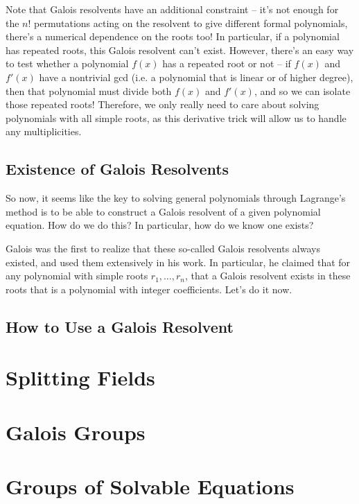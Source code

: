 \documentclass[12pt]{scrartcl}
\begin{document}
\begin{remark}
    Note that Galois resolvents have an additional constraint -- it's not enough for the $n!$ permutations acting on the resolvent to give different formal polynomials, there's a numerical dependence on the roots too! In particular, if a polynomial has repeated roots, this Galois resolvent can't exist. However, there's an easy way to test whether a polynomial $f(x)$ has a repeated root or not -- if $f(x)$ and $f'(x)$ have a nontrivial gcd (i.e. a polynomial that is linear or of higher degree), then that polynomial must divide both $f(x)$ and $f'(x)$, and so we can isolate those repeated roots! Therefore, we only really need to care about solving polynomials with all simple roots, as this derivative trick will allow us to handle any multiplicities. 
\end{remark}

\subsection{Existence of Galois Resolvents}
So now, it seems like the key to solving general polynomials through Lagrange's method is to be able to construct a Galois resolvent of a given polynomial equation. How do we do this? In particular, how do we know one exists? 

Galois was the first to realize that these so-called Galois resolvents always existed, and used them extensively in his work. In particular, he claimed that for any polynomial with simple roots $r_1, \dots, r_n$, that a Galois resolvent exists in these roots that is a polynomial with integer coefficients. Let's do it now. 

\subsection{How to Use a Galois Resolvent}

\section{Splitting Fields}


\section{Galois Groups}


\section{Groups of Solvable Equations}
\end{document}
